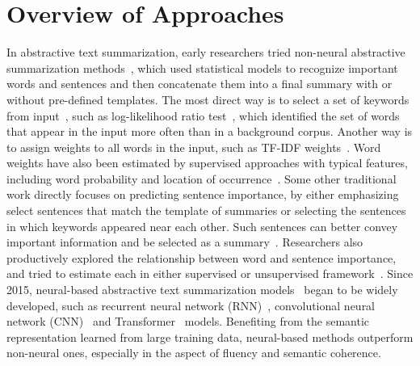 \section{Overview of Approaches}
\label{sec:approach}

In abstractive text summarization, early researchers tried non-neural abstractive summarization methods~\cite{banko-etal-2000-headline}, which used statistical models to recognize important words and sentences and then concatenate them into a final summary with or without pre-defined templates. The most direct way is to select a set of keywords from input~\cite{nenkova2005impact}, such as log-likelihood ratio test~\cite{lin2000automated}, which identified the set of words that appear in the input more often than in a background corpus. Another way is to assign weights to all words in the input, such as TF-IDF weights~\cite{berg2011jointly}. Word weights have also been estimated by supervised approaches with typical features, including word probability and location of occurrence~\cite{sipos2012large}. Some other traditional work directly focuses on predicting sentence importance, by either emphasizing select sentences that match the template of summaries or selecting the sentences in which keywords appeared near each other. Such sentences can better convey important information and be selected as a summary~\cite{celikyilmaz2010hybrid,litvak2010new}. Researchers also productively explored the relationship between word and sentence importance, and tried to estimate each in either supervised or unsupervised framework~\cite{liu2010supervised}. Since 2015, neural-based abstractive text summarization models~\cite{rush2015neural, see2017get} began to be widely developed, such as  recurrent neural network (RNN)~\cite{nallapati2016abstractive}, convolutional neural network
(CNN)~\cite{gehring2017convolutional}  and Transformer~\cite{vaswani2017attention} models. Benefiting from the semantic representation learned from large training data, neural-based methods outperform non-neural ones, especially in the aspect of fluency and semantic coherence.
